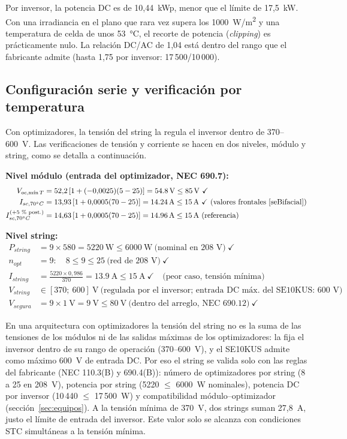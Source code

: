 \documentclass[12pt]{article}
\begin{document}
Por inversor, la potencia DC es de 10,44~kWp, menor que el límite de 17,5~kW. Con una irradiancia en el plano que rara vez supera los 1000~W/m\textsuperscript{2} y una temperatura de celda de unos 53~°C, el recorte de potencia (\emph{clipping}) es prácticamente nulo. La relación DC/AC de 1,04 está dentro del rango que el fabricante admite (hasta 1,75 por inversor: 17\,500/10\,000).

\subsection{Configuración serie y verificación por temperatura}
Con optimizadores, la tensión del string la regula el inversor dentro de 370--600~V. Las verificaciones de tensión y corriente se hacen en dos niveles, módulo y string, como se detalla a continuación.

\textbf{Nivel módulo (entrada del optimizador, NEC 690.7):}
\begin{align}
V_{oc,\text{mín}\,T} &= 52{,}2\,[1+(-0{,}0025)(5-25)] = \SI{54.8}{\volt} \leq \SI{85}{\volt}\ \checkmark\\
I_{sc,70^\circ C} &= 13{,}93\,[1+0{,}0005(70-25)] = \SI{14.24}{\ampere} \leq \SI{15}{\ampere}\ \checkmark\ \text{(valores frontales \cite{seBifacial})}\\
I_{sc,70^\circ C}^{\text{(+5~\% post.)}} &= 14{,}63\,[1+0{,}0005(70-25)] = \SI{14.96}{\ampere} \leq \SI{15}{\ampere}\ \text{(referencia)}
\end{align}

\textbf{Nivel string:}
\begin{align}
P_{string} &= 9\times 580 = \SI{5220}{\watt} \leq \SI{6000}{\watt}\ \text{(nominal en 208~V)}\ \checkmark\\
n_{opt} &= 9:\quad 8 \leq 9 \leq 25\ \text{(red de 208~V)}\ \checkmark\\
I_{string} &= \frac{5220\times0{,}986}{370} = \SI{13.9}{\ampere} \leq \SI{15}{\ampere}\ \checkmark \quad\text{(peor caso, tensión mínima)}\\
V_{string} &\in [370;\ 600]~\text{V}\ \text{(regulada por el inversor; entrada DC máx. del SE10KUS: 600~V)}\\
V_{segura} &= 9\times\SI{1}{\volt}=\SI{9}{\volt} \leq \SI{80}{\volt}\ \text{(dentro del arreglo, NEC 690.12)}\ \checkmark
\end{align}

En una arquitectura con optimizadores la tensión del string no es la suma de las tensiones de los módulos ni de las salidas máximas de los optimizadores: la fija el inversor dentro de su rango de operación (370--600~V), y el SE10KUS admite como máximo 600~V de entrada DC. Por eso el string se valida solo con las reglas del fabricante (NEC 110.3(B) y 690.4(B)): número de optimizadores por string (8 a 25 en 208~V), potencia por string (5220 $\leq$ 6000~W nominales), potencia DC por inversor (10\,440 $\leq$ 17\,500~W) y compatibilidad módulo--optimizador (sección~\ref{sec:equipos}). A la tensión mínima de 370~V, dos strings suman 27,8~A, justo el límite de entrada del inversor. Este valor solo se alcanza con condiciones STC simultáneas a la tensión mínima.
\end{document}

